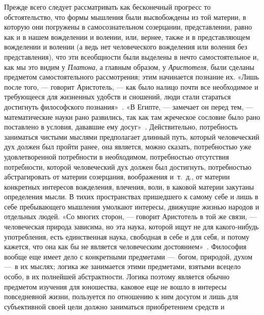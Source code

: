 Прежде всего следует рассматривать как бесконечный прогресс то
обстоятельство, что формы мышления были высвобождены из той материи, в
которую они погружены в самосознательном созерцании, представлении, равно
как и в нашем вожделении и волении, или, вернее, также и в представляющем
вожделении и волении (а ведь нет человеческого вожделения или воления без
представления), что эти всеобщности были выделены в нечто самостоятельное
и, как мы это видим у {\em Платона}, а главным образом,
у {\em Аристотеля}, были сделаны предметом
самостоятельного рассмотрения; этим начинается познание их. «Лишь после
того, — говорит Аристотель, — как было налицо почти все необходимое и
требующееся для жизненных удобств и сношений, люди стали стараться
достигнуть философского
познания»~.
«В Египте, — замечает он перед тем, — математические науки рано развились,
так как там жреческое сословие было рано поставлено в условия, дававшие ему
досуг»~.
Действительно, потребность заниматься чистыми мыслями предполагает длинный
путь, который человеческий дух должен был пройти ранее, она является, можно
сказать, потребностью уже удовлетворенной потребности в необходимом,
потребностью отсутствия потребности, которой человеческий дух должен был
достигнуть, потребностью абстрагировать от материи созерцания, воображения
и~т.~д., от материи конкретных интересов вожделения, влечения, воли, в
каковой материи закутаны определения мысли. В тихих пространствах
пришедшего к самому себе и лишь в себе пребывающего мышления умолкают
интересы, движущие жизнью народов и отдельных людей. «Со многих сторон, —
говорит Аристотель в той же связи, — человеческая природа зависима, но эта
наука, которой ищут не для какого-нибудь употребления, есть единственная
наука, свободная в себе и для себя, и потому кажется, что она как бы не
является человеческим
достоянием»~.
Философия вообще еще имеет дело с конкретными предметами —~богом, природой,
духом —~в их мыслях; логика же занимается этими предметами, взятыми всецело
особо, в их полнейшей абстрактности. Логика поэтому является обычно
предметом изучения для юношества, каковое еще не вошло в интересы
повседневной жизни, пользуется по отношению к ним досугом и лишь для
субъективной своей цели должно заниматься приобретением средств и
